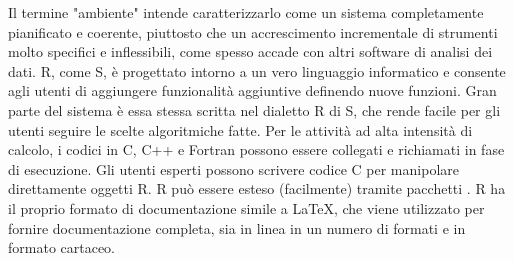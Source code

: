 Il termine "ambiente" intende caratterizzarlo come un sistema completamente pianificato e coerente, piuttosto che un accrescimento incrementale di strumenti molto specifici e inflessibili, come spesso accade con altri software di analisi dei dati. R, come S, è progettato intorno a un vero linguaggio informatico e consente agli utenti di aggiungere funzionalità aggiuntive definendo nuove funzioni. Gran parte del sistema è essa stessa scritta nel dialetto R di S, che rende facile per gli utenti seguire le scelte algoritmiche fatte. Per le attività ad alta intensità di calcolo, i codici in C, C++ e Fortran possono essere collegati e richiamati in fase di esecuzione. Gli utenti esperti possono scrivere codice C per manipolare direttamente oggetti R. R può essere esteso (facilmente) tramite pacchetti . R ha il proprio formato di documentazione simile a LaTeX, che viene utilizzato per fornire documentazione completa, sia in linea in un numero di formati e in formato cartaceo.
